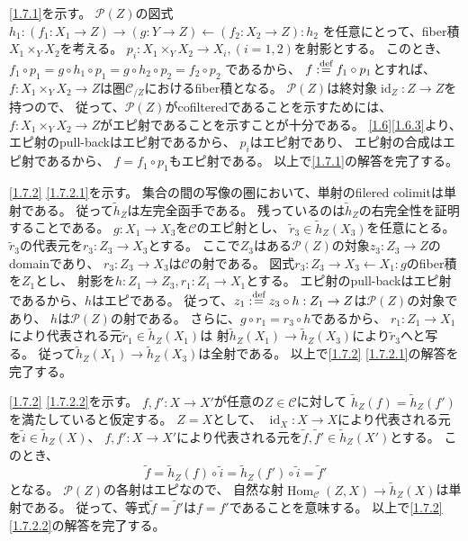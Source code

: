 \documentclass[uplatex,dvipdfmx]{jsarticle}
\makeatletter
\theoremstyle{definition}
\renewenvironment{proof}[1][\proofname]{
  \pushQED{\qed}%
  \normalfont \topsep6\p@\@plus6\p@\relax
  \trivlist
  \item[\hskip\labelsep
    #1\@addpunct{\textbf{.}}]\ignorespaces
}{%
  \popQED\endtrivlist\@endpefalse
}
\providecommand{\proofname}{証明}
\DeclareMathOperator{\Hom}{\mathrm{Hom}}
\DeclareMathOperator{\id}{\mathrm{id}}
\newcommand\mcC{\mathcal{C}}
\newcommand\mcP{\mathcal{P}}
\def\dfn{:\overset{\mbox{{\scriptsize def}}}{=}}
\makeatother
\begin{document}
\begin{proof}
  \ref{1.7.1}を示す。
  \(\mcP(Z)\)の図式
  \(h_1: (f_1:X_1\to Z) \to (g:Y\to Z) \gets (f_2:X_2\to Z) : h_2\)
  を任意にとって、fiber積\(X_1\times_Y X_2\)を考える。
  \(p_i: X_1\times_Y X_2\to X_i , (i=1,2)\)を射影とする。
  このとき、\(f_1\circ p_1 = g\circ h_1\circ p_1 = g\circ h_2\circ p_2 = f_2\circ p_2\)
  であるから、
  \(f\dfn f_1\circ p_1\)とすれば、
  \(f:X_1\times_Y X_2\to Z\)は圏\(\mcC_{/Z}\)におけるfiber積となる。
  \(\mcP(Z)\)は終対象\(\id_Z:Z\to Z\)を持つので、
  従って、\(\mcP(Z)\)がcofilteredであることを示すためには、
  \(f:X_1\times_Y X_2 \to Z\)がエピ射であることを示すことが十分である。
  \autoref{1.6}\ref{1.6.3}より、エピ射のpull-backはエピ射であるから、
  \(p_i\)はエピ射であり、
  エピ射の合成はエピ射であるから、
  \(f = f_1\circ p_1\)もエピ射である。
  以上で\ref{1.7.1}の解答を完了する。

  \ref{1.7.2} \ref{1.7.2.1}を示す。
  集合の間の写像の圏において、単射のfilered colimitは単射である。
  従って\(\tilde{h}_Z\)は左完全函手である。
  残っているのは\(\tilde{h}_Z\)の右完全性を証明することである。
  \(g:X_1\to X_3\)を\(\mcC\)のエピ射とし、
  \(\tilde{r}_3\in \tilde{h}_Z(X_3)\)を任意にとる。
  \(\tilde{r}_3\)の代表元を\(r_3:Z_3\to X_3\)とする。
  ここで\(Z_3\)はある\(\mcP(Z)\)の対象\(z_3:Z_3\to Z\)のdomainであり、
  \(r_3:Z_3\to X_3\)は\(\mcC\)の射である。
  図式\(r_3:Z_3\to X_3\gets X_1: g\)のfiber積を\(Z_1\)とし、
  射影を\(h:Z_1\to Z_3, r_1:Z_1\to X_1\)とする。
  エピ射のpull-backはエピ射であるから、\(h\)はエピである。
  従って、\(z_1\dfn z_3\circ h:Z_1\to Z\)は\(\mcP(Z)\)の対象であり、
  \(h\)は\(\mcP(Z)\)の射である。
  さらに、\(g\circ r_1 = r_3\circ h\)であるから、
  \(r_1:Z_1\to X_1\)により代表される元\(\tilde{r}_1\in \tilde{h}_Z(X_1)\)は
  射\(\tilde{h}_Z(X_1)\to \tilde{h}_Z(X_3)\)により\(\tilde{r}_3\)へと写る。
  従って\(\tilde{h}_Z(X_1)\to \tilde{h}_Z(X_3)\)は全射である。
  以上で\ref{1.7.2} \ref{1.7.2.1}の解答を完了する。

  \ref{1.7.2} \ref{1.7.2.2}を示す。
  \(f,f':X\to X'\)が任意の\(Z\in \mcC\)に対して
  \(\tilde{h}_Z(f) = \tilde{h}_Z(f')\)を満たしていると仮定する。
  \(Z=X\)として、
  \(\id_X:X\to X\)により代表される元を\(\tilde{i}\in \tilde{h}_Z(X)\)、
  \(f,f':X\to X'\)により代表される元を\(\tilde{f},\tilde{f}'\in \tilde{h}_Z(X')\)とする。
  このとき、
  \[
  \tilde{f} = \tilde{h}_Z(f)\circ \tilde{i}
  = \tilde{h}_Z(f')\circ \tilde{i} = \tilde{f}'
  \]
  となる。
  \(\mcP(Z)\)の各射はエピなので、
  自然な射\(\Hom_{\mcC}(Z,X)\to \tilde{h}_Z(X)\)は単射である。
  従って、等式\(\tilde{f}=\tilde{f}'\)は\(f=f'\)であることを意味する。
  以上で\ref{1.7.2} \ref{1.7.2.2}の解答を完了する。


\end{proof}
\end{document}
